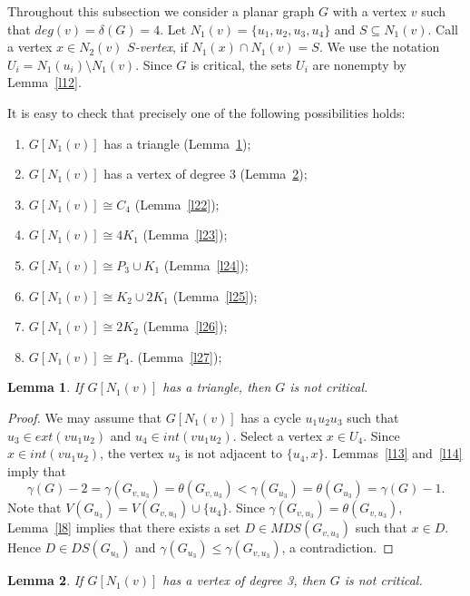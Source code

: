\documentclass[12pt]{article}
\newtheorem{lemma}{Lemma}
\begin{document}
Throughout this subsection we consider a planar graph $G$ with a vertex $v$ such that $deg(v) = \delta(G) = 4$. Let $N_1(v) = \{u_1,u_2,u_3,u_4\}$ and $S \subseteq N_1(v)$. Call a vertex $x \in N_2(v)$ \textit{$S$-vertex}, if $N_1(x) \cap N_1(v) = S$. We use the notation $U_i =  N_1(u_i) \setminus N_1(v)$. Since $G$ is critical, the sets $U_i$ are nonempty by Lemma~\ref{l12}.

It is easy to check that precisely one of the following possibilities holds:

\begin{enumerate}
\item $G[N_1(v)]$ has a triangle (Lemma~\ref{l20});
\item $G[N_1(v)]$ has a vertex of degree 3 (Lemma~\ref{l21});
\item $G[N_1(v)] \cong C_4$ (Lemma~\ref{l22});
\item $G[N_1(v)] \cong 4K_1$ (Lemma~\ref{l23}); 
\item $G[N_1(v)] \cong P_3 \cup K_1$ (Lemma~\ref{l24}); 
\item $G[N_1(v)] \cong K_2 \cup 2K_1$ (Lemma~\ref{l25}); 
\item $G[N_1(v)] \cong 2K_2$ (Lemma~\ref{l26}); 
\item $G[N_1(v)] \cong P_4$. (Lemma~\ref{l27});
\end{enumerate}

\begin{lemma}\label{l20}
If $G[N_1(v)]$ has a triangle, then $G$ is not critical.
\end{lemma}

\begin{proof} We may assume that $G[N_1(v)]$ has a cycle $u_1u_2u_3$ such that $u_3 \in ext(vu_1u_2)$ and $u_4 \in int(vu_1u_2)$. Select a vertex $x \in U_4$. Since $x \in int(vu_1u_2)$, the vertex $u_3$ is not adjacent to $\{u_4,x\}$. Lemmas~\ref{l13} and~\ref{l14} imply that $$\gamma(G) - 2 = \gamma(G_{v,u_3}) = \theta(G_{v,u_3}) < \gamma(G_{u_3}) = \theta(G_{u_3}) = \gamma(G) - 1.$$ Note that $V(G_{u_3}) = V(G_{v,u_3}) \cup \{u_4\}$. Since $\gamma(G_{v,u_3}) = \theta(G_{v,u_3})$, Lemma~\ref{l8} implies that there exists a set $D \in MDS(G_{v,u_3})$ such that $x \in D$.  Hence $D \in DS(G_{u_3})$ and $\gamma(G_{u_3}) \leq \gamma(G_{v,u_3})$, a contradiction.
\end{proof}

\begin{lemma}\label{l21}
If $G[N_1(v)]$ has a vertex of degree 3, then $G$ is not critical.
\end{lemma}
\end{document}
